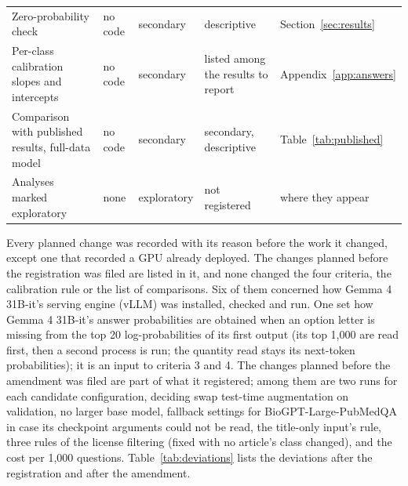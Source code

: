 \documentclass[11pt,letterpaper]{article}
\begin{document}
\begin{table}[H]
\begin{tabular}{>{\raggedright\arraybackslash}p{5.5cm}ll>{\raggedright\arraybackslash}p{2.5cm}>{\raggedright\arraybackslash}p{2.7cm}}
Zero-probability check & no code & secondary & descriptive & Section~\ref{sec:results} \\[1pt]
Per-class calibration slopes and intercepts & no code & secondary & listed among the results to report & Appendix~\ref{app:answers} \\[1pt]
Comparison with published results, full-data model & no code & secondary & secondary, descriptive & Table~\ref{tab:published} \\[1pt]
Analyses marked exploratory & none & exploratory & not registered & where they appear \\
\bottomrule
\end{tabular}
\end{table}

Every planned change was recorded with its reason before the work it changed, except one that recorded a GPU already deployed. The changes planned before the registration was filed are listed in it, and none changed the four criteria, the calibration rule or the list of comparisons. Six of them concerned how Gemma 4 31B-it's serving engine (vLLM) was installed, checked and run. One set how Gemma 4 31B-it's answer probabilities are obtained when an option letter is missing from the top 20 log-probabilities of its first output (its top 1,000 are read first, then a second process is run; the quantity read stays its next-token probabilities); it is an input to criteria 3 and 4. The changes planned before the amendment was filed are part of what it registered; among them are two runs for each candidate configuration, deciding swap test-time augmentation on validation, no larger base model, fallback settings for BioGPT-Large-PubMedQA in case its checkpoint arguments could not be read, the title-only input's rule, three rules of the license filtering (fixed with no article's class changed), and the cost per 1,000 questions. Table~\ref{tab:deviations} lists the deviations after the registration and after the amendment.
\end{document}
